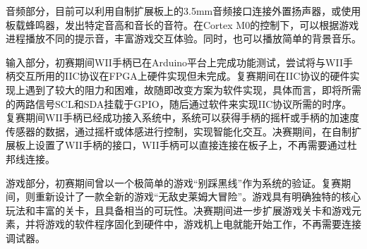 音频部分，目前可以利用自制扩展板上的3.5mm音频接口连接外置扬声器，或使用板载蜂鸣器，发出特定音高和音长的音符。在Cortex M0的控制下，可以根据游戏进程播放不同的提示音，丰富游戏交互体验。同时，也可以播放简单的背景音乐。

输入部分，初赛期间WII手柄已在Arduino平台上完成功能测试，尝试将与WII手柄交互所用的IIC协议在FPGA上硬件实现但未完成。复赛期间在IIC协议的硬件实现上遇到了较大的阻力和困难，故随即改变方案为软件实现，具体而言，即将所需的两路信号SCL和SDA挂载于GPIO，随后通过软件来实现IIC协议所需的时序。复赛期间WII手柄已经成功接入系统中，系统可以获得手柄的摇杆或手柄的加速度传感器的数据，通过摇杆或体感进行控制，实现智能化交互。决赛期间，在自制扩展板上设置了WII手柄的接口，WII手柄可以直接连接在板子上，不再需要通过杜邦线连接。

游戏部分，初赛期间曾以一个极简单的游戏“别踩黑线”作为系统的验证。复赛期间，则重新设计了一款全新的游戏“无敌史莱姆大冒险”。游戏具有明确独特的核心玩法和丰富的关卡，且具备相当的可玩性。决赛期间进一步扩展游戏关卡和游戏元素，并将游戏的软件程序固化到硬件中，游戏机上电就能开始工作，不再需要连接调试器。
